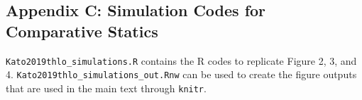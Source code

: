 


\subsection{Appendix C: Simulation Codes for Comparative Statics}

\par \nolinkurl{Kato2019thlo_simulations.R} contains the R codes to replicate Figure 2, 3, and 4. \nolinkurl{Kato2019thlo_simulations_out.Rnw} can be used to create the figure outputs that are used in the main text through \nolinkurl{knitr}.


